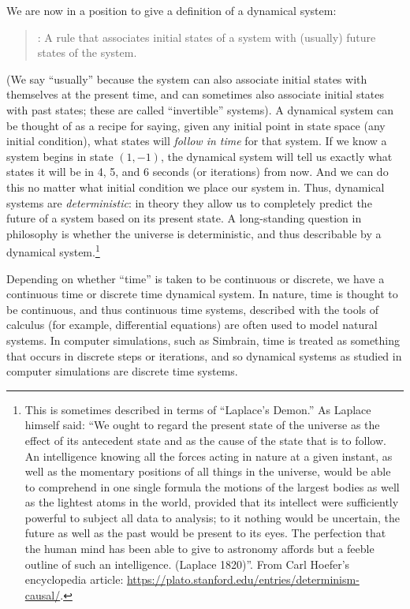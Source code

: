 We are now in a position to give a definition of a dynamical system:
\begin{quote}
: A rule that associates initial states of a system with (usually) future states of the system.
\end{quote}
(We say ``usually'' because the system can also associate initial states with themselves at the present time, and can sometimes also associate initial states with past states; these are called ``invertible'' systems).
A dynamical system can be thought of as a recipe for saying, given any initial 
point in state space (any initial condition), what states will {\em follow in 
time} for that system. If we know a system begins in state $(1,-1)$, the 
dynamical system will tell us exactly what states it will be in 4, 5, and 6 
seconds (or iterations) from now. And we can do this no matter what initial 
condition we place our system in. Thus, dynamical systems are \emph{deterministic}: in
theory they allow us to completely predict the future of a system based on its 
present state. A long-standing question in philosophy is whether the universe is deterministic, and thus describable by a dynamical system.\footnote{This is sometimes described in terms of ``Laplace's Demon.''   As Laplace himself said: ``We ought to regard the present state of the universe as the effect of its antecedent state and as the cause of the state that is to follow. An intelligence knowing all the forces acting in nature at a given instant, as well as the momentary positions of all things in the universe, would be able to comprehend in one single formula the motions of the largest bodies as well as the lightest atoms in the world, provided that its intellect were sufficiently powerful to subject all data to analysis; to it nothing would be uncertain, the future as well as the past would be present to its eyes. The perfection that the human mind has been able to give to astronomy affords but a feeble outline of such an intelligence. (Laplace 1820)''. From Carl Hoefer's encyclopedia article: \url{https://plato.stanford.edu/entries/determinism-causal/}.}

Depending on whether ``time'' is taken to be continuous or discrete, we have a continuous time or discrete time dynamical system. In nature, time is thought to be continuous, and thus continuous time systems, described with the tools of calculus (for example, differential equations) are often used to model natural systems. In computer simulations, such as Simbrain, time is treated as something that occurs in discrete steps or iterations, and so dynamical systems as studied in computer simulations are discrete time systems.

